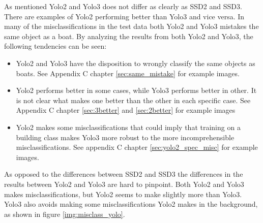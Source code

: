 As mentioned Yolo2 and Yolo3 does not differ as clearly as SSD2 and SSD3. There are examples of Yolo2 performing better than Yolo3 and vice versa. In many of the misclassifications in the test data both Yolo2 and Yolo3 mistakes the same object as a boat. By analyzing the results from both Yolo2 and Yolo3, the following tendencies can be seen:

\begin{itemize}
    \item Yolo2 and Yolo3 have the disposition to wrongly classify the same objects as boats. See Appendix C chapter \ref{sec:same_mistake} for example images.
    \item Yolo2 performs better in some cases, while Yolo3 performs better in other. It is not clear what makes one better than the other in each specific case. See Appendix C chapter \ref{sec:3better} and \ref{sec:2better} for example images
    \item Yolo2 makes some misclassifications that could imply that training on a building class makes Yolo3 more robust to the more incomprehensible misclassifications. See appendix C chapter \ref{sec:yolo2_spec_misc} for example images.
\end{itemize}

As opposed to the differences between SSD2 and SSD3 the differences in the results between Yolo2 and Yolo3 are hard to pinpoint. Both Yolo2 and Yolo3 makes misclassifications, but Yolo2 seems to make slightly more than Yolo3. Yolo3 also avoids making some misclassifications Yolo2 makes in the background, as shown in figure \ref{img:misclass_yolo}.

